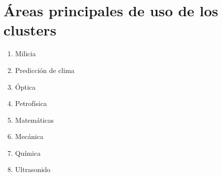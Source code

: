 
\section{Áreas principales de uso de los clusters}
\begin{enumerate}
    \item Milicia
    \item Predicción de clima
    \item Óptica
    \item Petrofísica
    \item Matemáticas
    \item Mecánica
    \item Química
    \item Ultrasonido
\end{enumerate}
